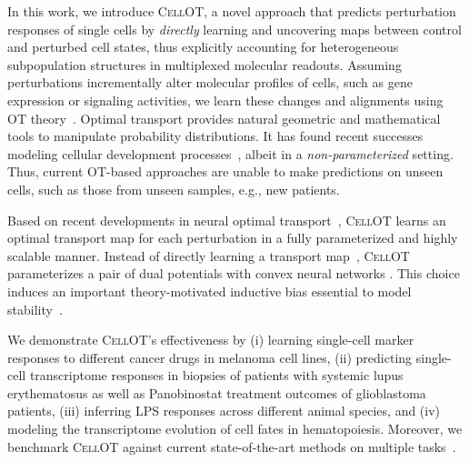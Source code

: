  In this work, we introduce \textsc{CellOT}, a novel approach that predicts perturbation responses of single cells by \emph{directly} learning and uncovering maps between control and perturbed cell states, thus explicitly accounting for heterogeneous subpopulation structures in multiplexed molecular readouts.
Assuming perturbations incrementally alter molecular profiles of cells, such as gene expression or signaling activities, we learn these changes and alignments using \acrlong{OT} theory~\citep{villani2009optimal}. Optimal transport provides natural geometric and mathematical tools to manipulate probability distributions. It has found recent successes modeling cellular development processes~\citep{lavenant2021towards, schiebinger2019optimal}, albeit in a {\em non-parameterized} setting. Thus, current OT-based approaches are unable to make predictions on unseen cells, such as those from unseen samples, e.g., new patients. 

 Based on recent developments in neural optimal transport~\citep{makkuva2020optimal}, \textsc{CellOT} learns an optimal transport map for each perturbation in a fully parameterized and highly scalable manner. Instead of directly learning a transport map~\citep{korotin2021wasserstein, yang2018scalable, prasad2020optimal}, \textsc{CellOT} parameterizes a pair of dual potentials with convex neural networks \citep{amos2017input}. This choice induces an important theory-motivated inductive bias essential to model stability~\citep{makkuva2020optimal}. 

 We demonstrate \textsc{CellOT}'s effectiveness by (i) learning single-cell marker responses to different cancer drugs in melanoma cell lines, (ii) predicting single-cell transcriptome responses in biopsies of patients with systemic lupus erythematosus as well as Panobinostat treatment outcomes of glioblastoma patients, (iii) inferring LPS responses across different animal species, and (iv) modeling the transcriptome evolution of cell fates in hematopoiesis. Moreover, we benchmark \textsc{CellOT} against current state-of-the-art methods on multiple tasks~\citep{Lopez2018scvi, lotfollahi2019scgen}.


